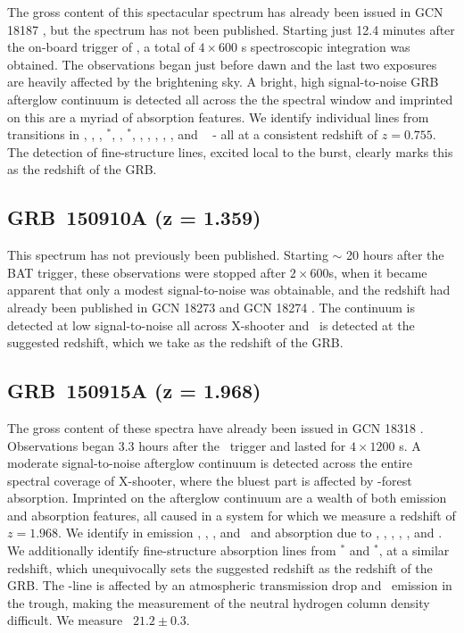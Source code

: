 \documentclass[longauth]{aa}    %
\begin{document}
The gross content of this spectacular spectrum has already been issued in GCN
18187 \citep{GCN18187}, but the spectrum has not been published. Starting just
12.4 minutes after the on-board trigger of \swift, a total of $4 \times 600$ s
spectroscopic integration was obtained. The observations began just before dawn
and the last two exposures are heavily affected by the brightening sky. A
bright, high signal-to-noise GRB afterglow continuum is detected all across the
the spectral window and imprinted on this are a myriad of absorption features.
We identify individual lines from transitions in \aliii, \crii, \znii,
\NIii$^*$, \feii, \feii$^*$, \scii, \mnii, \mgii, \mgi, \TIii, and  \caii~ - all
at a consistent redshift of $z = 0.755$. The detection of fine-structure lines,
excited local to the burst, clearly marks this as the redshift of the GRB.

\subsection{GRB~150910A (z = 1.359)}\label{150910}

This spectrum has not previously been published. Starting $\sim$ 20 hours after
the BAT trigger, these observations were stopped after $2 \times 600$s, when it
became apparent that only a modest signal-to-noise was obtainable, and the
redshift had already been published in GCN 18273 \citep{GCN18273} and GCN 18274
\citep{GCN18274}. The continuum is detected at low signal-to-noise all across
X-shooter and \mgii~is detected at the suggested redshift, which we take as the
redshift of the GRB.

\subsection{GRB~150915A (z = 1.968)}\label{150915}

The gross content of these spectra have already been issued in GCN 18318
\citep{GCN18318}. Observations began 3.3 hours after the \swift~trigger and
lasted for $4 \times 1200$ s. A moderate signal-to-noise afterglow continuum is
detected across the entire spectral coverage of X-shooter, where the
bluest part is affected by \lya-forest absorption. Imprinted on the afterglow
continuum are a wealth of both emission and absorption features, all caused in a
system for which we measure a redshift of $z = 1.968$. We identify in emission
\oii, \hb, \oiii, and \ha~and absorption due to \lya, \civ, \alii, \SIii, \feii,
and \mgii. We additionally identify fine-structure absorption lines from
\SIii$^*$ and \feii$^*$, at a similar redshift, which unequivocally sets the
suggested redshift as the redshift of the GRB. The \lya-line is affected by an
atmospheric transmission drop and \lya~emission in the trough, making the
measurement of the neutral hydrogen column density difficult. We measure
\nh~$21.2 \pm 0.3$.
\end{document}
